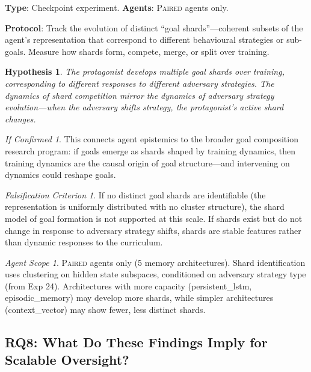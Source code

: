 \documentclass[11pt,a4paper]{article}
\newtheorem{hypothesis}{Hypothesis}[subsection]
\theoremstyle{remark}
\newtheorem*{falsification}{Falsification Criterion}
\newtheorem*{implication}{If Confirmed}
\newtheorem*{agentscope}{Agent Scope}
\newcommand{\paired}{\textsc{Paired}}
\begin{document}
\textbf{Type}: Checkpoint experiment. \textbf{Agents}: \paired{} agents only.

\textbf{Protocol}: Track the evolution of distinct ``goal shards''---coherent subsets of the agent's representation that correspond to different behavioural strategies or sub-goals. Measure how shards form, compete, merge, or split over training.

\begin{hypothesis}
The protagonist develops multiple goal shards over training, corresponding to different responses to different adversary strategies. The dynamics of shard competition mirror the dynamics of adversary strategy evolution---when the adversary shifts strategy, the protagonist's active shard changes.
\end{hypothesis}

\begin{implication}
This connects agent epistemics to the broader goal composition research program: if goals emerge as shards shaped by training dynamics, then training dynamics are the causal origin of goal structure---and intervening on dynamics could reshape goals.
\end{implication}

\begin{falsification}
If no distinct goal shards are identifiable (the representation is uniformly distributed with no cluster structure), the shard model of goal formation is not supported at this scale. If shards exist but do not change in response to adversary strategy shifts, shards are stable features rather than dynamic responses to the curriculum.
\end{falsification}

\begin{agentscope}
\paired{} agents only (5 memory architectures). Shard identification uses clustering on hidden state subspaces, conditioned on adversary strategy type (from Exp 24). Architectures with more capacity (persistent\_lstm, episodic\_memory) may develop more shards, while simpler architectures (context\_vector) may show fewer, less distinct shards.
\end{agentscope}

\subsection{RQ8: What Do These Findings Imply for Scalable Oversight?}
\label{sec:rq8}
\end{document}

